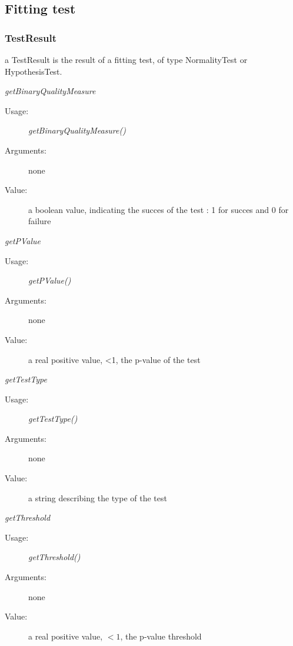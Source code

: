 \newpage
\subsection{Fitting test}
\subsubsection{TestResult}

\begin{description}
\item[Usage:] a TestResult is the result of a fitting test, of type NormalityTest or HypothesisTest.

\item[Some methods :]  \rule{0pt}{1em}

\begin{description}
\item \textit{getBinaryQualityMeasure}
\begin{description}
\item[Usage:] \textit{getBinaryQualityMeasure()}
\item[Arguments:] none
\item[Value:]  a boolean value, indicating the succes of the test : 1 for succes and 0 for failure
\end{description}
\bigskip

\item \textit{getPValue}
\begin{description}
\item[Usage:] \textit{getPValue()}
\item[Arguments:] none
\item[Value:] a real positive value, <1, the p-value of the test
\end{description}
\bigskip

\item \textit{getTestType}
\begin{description}
\item[Usage:] \textit{getTestType()}
\item[Arguments:] none
\item[Value:] a string describing the type of the test
\end{description}
\bigskip


\item \textit{getThreshold}
\begin{description}
\item[Usage:] \textit{getThreshold()}
\item[Arguments:] none
\item[Value:] a real positive value, $<1$, the p-value threshold
\end{description}

\end{description}

\end{description}





